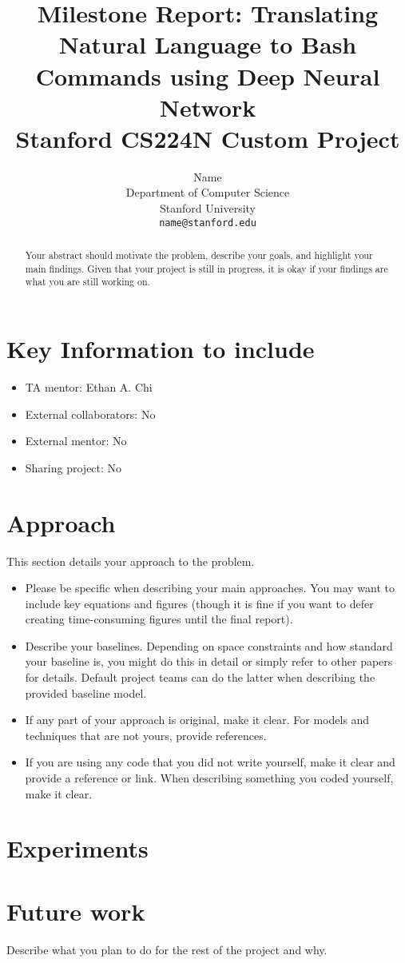 \documentclass{article}
\title{
  Milestone Report: Translating Natural Language to Bash Commands using Deep Neural Network \\
  \vspace{1em}
  \small{\normalfont Stanford CS224N Custom Project  }
}
\author{
  Name \\
  Department of Computer Science \\
  Stanford University \\
  \texttt{name@stanford.edu} \\
}
\begin{document}
\maketitle

\begin{abstract}
  Your abstract should motivate the problem, describe your goals, and highlight your main findings. Given that your project is still in progress, it is okay if your findings are what you are still working on.
\end{abstract}


\section{Key Information to include}
\begin{itemize}
    \item TA mentor: Ethan A. Chi
    \item External collaborators: No
    \item External mentor: No
    \item Sharing project: No
\end{itemize}


\section{Approach}
This section details your approach to the problem. 
\begin{itemize}
    \item Please be specific when describing your main approaches. You may want to include key equations and figures (though it is fine if you want to defer creating time-consuming figures until the final report).
    \item Describe your baselines. Depending on space constraints and how standard your baseline is, you might do this in detail or simply refer to other papers for details. Default project teams can do the latter when describing the provided baseline model.
    \item If any part of your approach is original, make it clear. For models and techniques that are not yours, provide references.
    \item If you are using any code that you did not write yourself, make it clear and provide a reference or link. 
    When describing something you coded yourself, make it clear.
\end{itemize} 


\section{Experiments}



\section{Future work}
Describe what you plan to do for the rest of the project and why.




\end{document}
